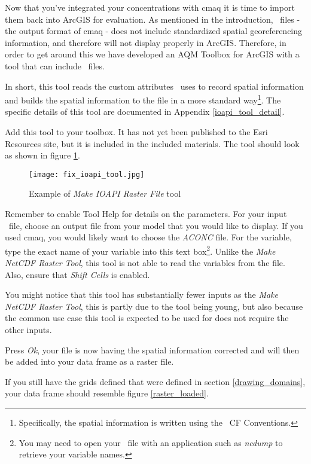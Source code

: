 Now that you've integrated your concentrations with \acs{cmaq} it is
time to import them back into ArcGIS for evaluation.  As mentioned in
the introduction, \ioapi~files - the output format of \acs{cmaq} -
does not include standardized spatial georeferencing information, and
therefore will not display properly in ArcGIS.  Therefore, in order to
get around this we have developed an AQM Toolbox for ArcGIS with a
tool that can include \ioapi~files.

In short, this tool reads the custom attributes \ioapi~uses to record
spatial information and builds the spatial information to the file in
a more standard way\footnote{Specifically, the spatial information is
written using the \netcdf~CF Conventions.}.  The specific details of
this tool are documented in Appendix \ref{ioapi_tool_detail}.

Add this tool to your toolbox.  It has not yet been published to the
Esri Resources site, but it is included in the included
materials.  The tool should look as shown in figure \ref{ioapi_tool}.

\begin{figure}
	\centering
	\texttt{[image: fix\_ioapi\_tool.jpg]}
	\caption{Example of \emph{Make IOAPI Raster File} tool}
	\label{ioapi_tool}
\end{figure}

Remember to enable Tool Help for details on the parameters.  For your
input \ioapi~file, choose an output file from your model that you
would like to display.  If you used \acs{cmaq}, you would likely want
to choose the \emph{ACONC} file.  For the variable, type the exact
name of your variable into this text box\footnote{You may need to open
your \netcdf~file with an application such as \emph{ncdump} to
retrieve your variable names.}.  Unlike the \emph{Make NetCDF
Raster Tool}, this tool is not able to read the variables from the
file.  Also, ensure that \emph{Shift Cells} is enabled.

You might notice that this tool has substantially fewer inputs as the
\emph{Make NetCDF Raster Tool}, this is partly due to the tool being
young, but also because the common use case this tool is expected to
be used for does not require the other inputs.

Press \emph{Ok}, your file is now having the spatial information
corrected and will then be added into your data frame as a raster
file.

If you still have the grids defined that were defined in section \ref{drawing_domains},
your data frame should resemble figure \ref{raster_loaded}.

